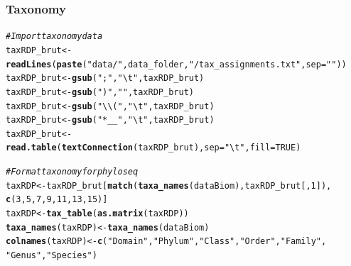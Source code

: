 \documentclass[12pt]{article}\usepackage[]{graphicx}\usepackage[]{color}
\makeatletter
\newcommand{\hlnum}[1]{\textcolor[rgb]{0.686,0.059,0.569}{#1}}%
\newcommand{\hlstr}[1]{\textcolor[rgb]{0.192,0.494,0.8}{#1}}%
\newcommand{\hlcom}[1]{\textcolor[rgb]{0.678,0.584,0.686}{\textit{#1}}}%
\newcommand{\hlstd}[1]{\textcolor[rgb]{0.345,0.345,0.345}{#1}}%
\newcommand{\hlkwb}[1]{\textcolor[rgb]{0.69,0.353,0.396}{#1}}%
\newcommand{\hlkwc}[1]{\textcolor[rgb]{0.333,0.667,0.333}{#1}}%
\newcommand{\hlkwd}[1]{\textcolor[rgb]{0.737,0.353,0.396}{\textbf{#1}}}%
\newenvironment{kframe}{%
 \def\at@end@of@kframe{}%
 \ifinner\ifhmode%
  \def\at@end@of@kframe{\end{minipage}}%
  \begin{minipage}{\columnwidth}%
 \fi\fi%
 \def\FrameCommand##1{\hskip\@totalleftmargin \hskip-\fboxsep
 \colorbox{shadecolor}{##1}\hskip-\fboxsep
     \hskip-\linewidth \hskip-\@totalleftmargin \hskip\columnwidth}%
 \MakeFramed {\advance\hsize-\width
   \@totalleftmargin\z@ \linewidth\hsize
   \@setminipage}}%
 {\par\unskip\endMakeFramed%
 \at@end@of@kframe}
\newenvironment{knitrout}{}{} %
\numberwithin{figure}{section}
\makeatother
\begin{document}
  \subsubsection{Taxonomy}
\begin{knitrout}\small
{}\color{fgcolor}\begin{kframe}
\begin{alltt}
\hlcom{#Import taxonomy data}
\hlstd{taxRDP_brut} \hlkwb{<-} \hlkwd{readLines}\hlstd{(}\hlkwd{paste}\hlstd{(}\hlstr{"data/"}\hlstd{, data_folder,} \hlstr{"/tax_assignments.txt"}\hlstd{,} \hlkwc{sep}\hlstd{=}\hlstr{""}\hlstd{))}
\hlstd{taxRDP_brut} \hlkwb{<-} \hlkwd{gsub}\hlstd{(}\hlstr{";"}\hlstd{,} \hlstr{"\textbackslash{}t"}\hlstd{, taxRDP_brut)}
\hlstd{taxRDP_brut} \hlkwb{<-} \hlkwd{gsub}\hlstd{(}\hlstr{")"}\hlstd{,} \hlstr{""}\hlstd{, taxRDP_brut)}
\hlstd{taxRDP_brut} \hlkwb{<-} \hlkwd{gsub}\hlstd{(}\hlstr{"\textbackslash{}\textbackslash{}("}\hlstd{,} \hlstr{"\textbackslash{}t"}\hlstd{, taxRDP_brut)}
\hlstd{taxRDP_brut} \hlkwb{<-} \hlkwd{gsub}\hlstd{(}\hlstr{"*__"}\hlstd{,} \hlstr{"\textbackslash{}t"}\hlstd{, taxRDP_brut)}
\hlstd{taxRDP_brut} \hlkwb{<-} \hlkwd{read.table}\hlstd{(}\hlkwd{textConnection}\hlstd{(taxRDP_brut),} \hlkwc{sep} \hlstd{=} \hlstr{"\textbackslash{}t"}\hlstd{,} \hlkwc{fill} \hlstd{=} \hlnum{TRUE}\hlstd{)}
\end{alltt}
\end{kframe}
\end{knitrout}


\begin{knitrout}\small
{}\color{fgcolor}\begin{kframe}
\begin{alltt}
\hlcom{# Format taxonomy for phyloseq}
\hlstd{taxRDP} \hlkwb{<-} \hlstd{taxRDP_brut[}\hlkwd{match}\hlstd{(}\hlkwd{taxa_names}\hlstd{(dataBiom), taxRDP_brut[,} \hlnum{1}\hlstd{]),}
                       \hlkwd{c}\hlstd{(}\hlnum{3}\hlstd{,} \hlnum{5}\hlstd{,} \hlnum{7}\hlstd{,} \hlnum{9}\hlstd{,} \hlnum{11}\hlstd{,} \hlnum{13}\hlstd{,} \hlnum{15}\hlstd{)]}
\hlstd{taxRDP} \hlkwb{<-} \hlkwd{tax_table}\hlstd{(}\hlkwd{as.matrix}\hlstd{(taxRDP))}
\hlkwd{taxa_names}\hlstd{(taxRDP)} \hlkwb{<-} \hlkwd{taxa_names}\hlstd{(dataBiom)}
\hlkwd{colnames}\hlstd{(taxRDP)} \hlkwb{<-} \hlkwd{c}\hlstd{(}\hlstr{"Domain"}\hlstd{,} \hlstr{"Phylum"}\hlstd{,} \hlstr{"Class"}\hlstd{,} \hlstr{"Order"}\hlstd{,} \hlstr{"Family"}\hlstd{,}
                      \hlstr{"Genus"}\hlstd{,} \hlstr{"Species"}\hlstd{)}
\end{alltt}
\end{kframe}
\end{knitrout}
\end{document}
